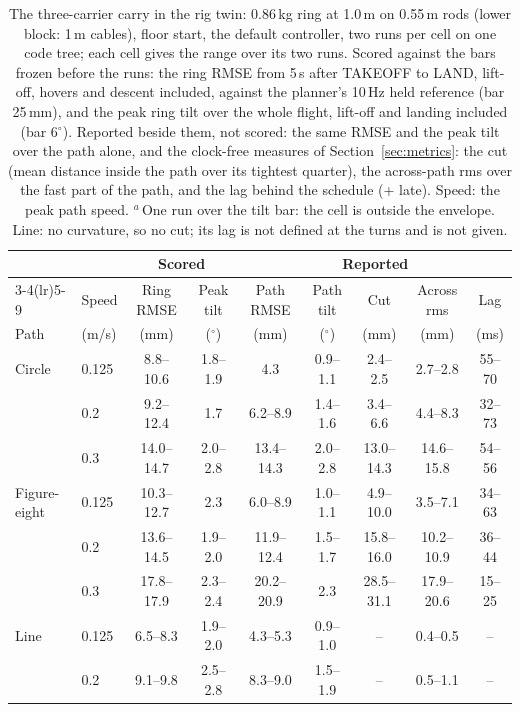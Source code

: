 \begin{table}[htbp]
\centering
\footnotesize
\setlength{\tabcolsep}{2.6pt}
\caption[The carry in the twin: the speed envelope]{The three-carrier carry in the rig twin: 0.86\,kg ring at
1.0\,m on 0.55\,m rods (lower block: 1\,m cables), floor start, the default controller, two runs per cell on one
code tree; each cell gives the range over its two runs. Scored against the bars frozen before the runs: the ring RMSE
from 5\,s after TAKEOFF to LAND, lift-off, hovers and descent included, against the planner's 10\,Hz held reference
(bar 25\,mm), and the peak ring tilt over the whole flight, lift-off and landing included (bar 6$^\circ$). Reported
beside them, not scored: the same RMSE and the peak tilt over the path alone, and the clock-free measures of
Section~\ref{sec:metrics}: the cut (mean distance inside the path over its tightest quarter), the across-path rms over
the fast part of the path, and the lag behind the schedule (+ late). Speed: the peak path speed. $^a$\,One run over the
tilt bar: the cell is outside the envelope. Line: no curvature, so no cut; its lag is not defined at the turns and is
not given.}
\label{tab:T7t}
\begin{tabular}{llccccccc}
\toprule
 & & \multicolumn{2}{c}{Scored} & \multicolumn{5}{c}{Reported} \\
\cmidrule(lr){3-4}\cmidrule(lr){5-9}
 & Speed & Ring RMSE & Peak tilt & Path RMSE & Path tilt & Cut & Across rms & Lag \\
Path & (m/s) & (mm) & ($^\circ$) & (mm) & ($^\circ$) & (mm) & (mm) & (ms) \\
\midrule
Circle & 0.125 & 8.8--10.6 & 1.8--1.9 & 4.3 & 0.9--1.1 & 2.4--2.5 & 2.7--2.8 & 55--70 \\
 & 0.2 & 9.2--12.4 & 1.7 & 6.2--8.9 & 1.4--1.6 & 3.4--6.6 & 4.4--8.3 & 32--73 \\
 & 0.3 & 14.0--14.7 & 2.0--2.8 & 13.4--14.3 & 2.0--2.8 & 13.0--14.3 & 14.6--15.8 & 54--56 \\
\addlinespace
Figure-eight & 0.125 & 10.3--12.7 & 2.3 & 6.0--8.9 & 1.0--1.1 & 4.9--10.0 & 3.5--7.1 & 34--63 \\
 & 0.2 & 13.6--14.5 & 1.9--2.0 & 11.9--12.4 & 1.5--1.7 & 15.8--16.0 & 10.2--10.9 & 36--44 \\
 & 0.3 & 17.8--17.9 & 2.3--2.4 & 20.2--20.9 & 2.3 & 28.5--31.1 & 17.9--20.6 & 15--25 \\
\addlinespace
Line & 0.125 & 6.5--8.3 & 1.9--2.0 & 4.3--5.3 & 0.9--1.0 & -- & 0.4--0.5 & -- \\
 & 0.2 & 9.1--9.8 & 2.5--2.8 & 8.3--9.0 & 1.5--1.9 & -- & 0.5--1.1 & -- \\

\end{tabular}
\end{table}
